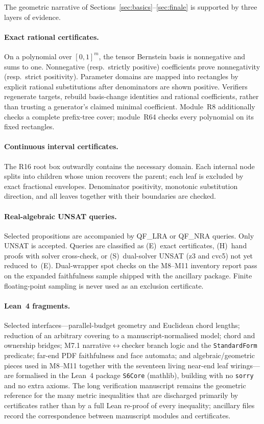 \documentclass[11pt,reqno]{amsart}
\theoremstyle{definition}
\begin{document}
The geometric narrative of Sections~\ref{sec:basics}--\ref{sec:finale} is
supported by three layers of evidence.

\paragraph{Exact rational certificates.}
On a polynomial over $[0,1]^m$, the tensor Bernstein basis is nonnegative and
sums to one.  Nonnegative (resp.\ strictly positive) coefficients prove
nonnegativity (resp.\ strict positivity).  Parameter domains are mapped into
rectangles by explicit rational substitutions after denominators are shown
positive.  Verifiers regenerate targets, rebuild basis-change identities and
rational coefficients, rather than trusting a generator's claimed minimal
coefficient.  Module~R8 additionally checks a complete prefix-tree cover;
module~R64 checks every polynomial on its fixed rectangles.

\paragraph{Continuous interval certificates.}
The R16 root box outwardly contains the necessary domain.  Each internal node
splits into children whose union recovers the parent; each leaf is excluded by
exact fractional envelopes.  Denominator positivity, monotonic substitution
direction, and all leaves together with their boundaries are checked.

\paragraph{Real-algebraic UNSAT queries.}
Selected propositions are accompanied by QF\_LRA or QF\_NRA queries.  Only
UNSAT is accepted.  Queries are classified as (E)~exact certificates,
(H)~hand proofs with solver cross-check, or (S)~dual-solver UNSAT (z3 and
cvc5) not yet reduced to~(E).  Dual-wrapper spot checks on the M8--M11
inventory report pass on the expanded faithfulness sample shipped with the
ancillary package.  Finite floating-point sampling is never used as an
exclusion certificate.

\paragraph{Lean~4 fragments.}
Selected interfaces---parallel-budget geometry and Euclidean chord lengths;
reduction of an arbitrary covering to a manuscript-normalised model; chord and
ownership bridges; M7.1 narrative$\leftrightarrow$checker branch logic and the
\texttt{StandardForm} predicate; far-end PDF faithfulness and face automata;
and algebraic/geometric pieces used in M8--M11 together with the seventeen
living near-end leaf wirings---are formalised in the Lean~4 package
\texttt{S6Core} (mathlib), building with no \texttt{sorry} and no extra axioms.
The long verification manuscript remains the geometric reference for the many
metric inequalities that are discharged primarily by certificates rather than
by a full Lean re-proof of every inequality; ancillary files record the
correspondence between manuscript modules and certificates.
\end{document}
